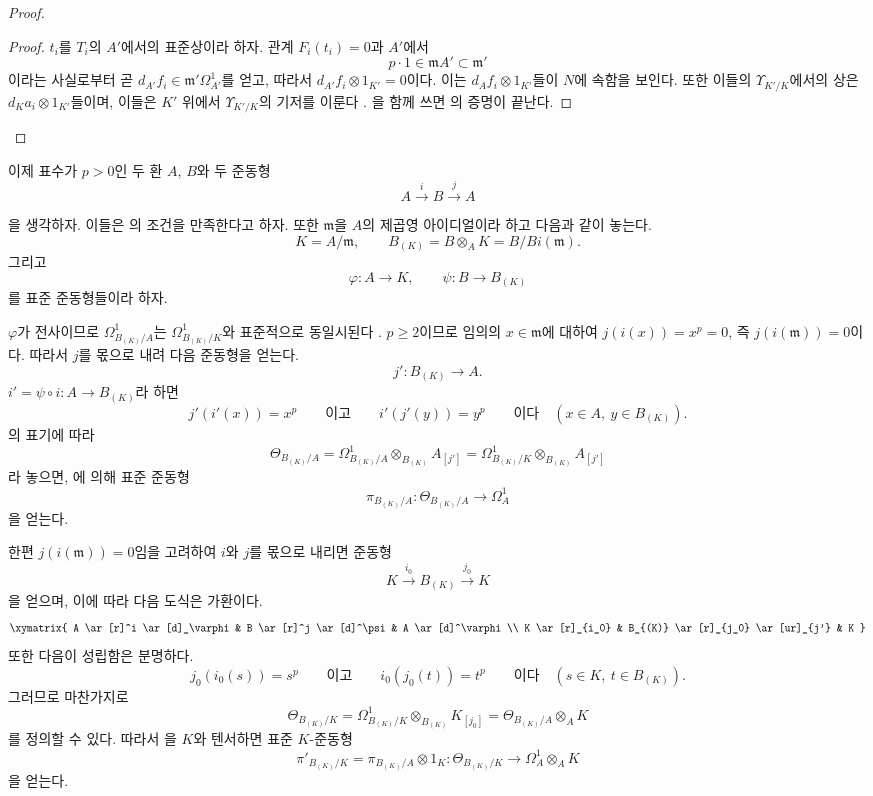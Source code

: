 \begin{proof}
\begin{proof}
$t_i$를 $T_i$의 $A'$에서의 표준상이라 하자. 관계 $F_i(t_i)=0$과
$A'$에서
\[
  p\cdot1\in\mathfrak mA'\subset\mathfrak m'
\]
이라는 사실로부터 곧
$d_{A'}f_i\in\mathfrak m'\Omega^1_{A'}$를 얻고, 따라서
$d_{A'}f_i\otimes1_{K'}=0$이다. 이는
$d_Af_i\otimes1_{K'}$들이 $N$에 속함을 보인다. 또한 이들의
$\Upsilon_{K'/K}$에서의 상은 $d_Ka_i\otimes1_{K'}$들이며, 이들은
$K'$ 위에서 $\Upsilon_{K'/K}$의 기저를 이룬다
. 을 함께 쓰면
의 증명이 끝난다.
\end{proof}
\end{proof}

\begin{env}[22.4.5]
\label{0.22.4.5-ko}
이제 표수가 $p>0$인 두 환 $A$, $B$와 두 준동형
\[
  A\xrightarrow{i}B\xrightarrow{j}A
\]


을 생각하자. 이들은 의 조건을 만족한다고 하자.
또한 $\mathfrak m$을 $A$의 제곱영 아이디얼이라 하고 다음과 같이 놓는다.
\[
  K=A/\mathfrak m,\qquad
  B_{(K)}=B\otimes_AK=B/Bi(\mathfrak m).
\]
그리고
\[
  \varphi:A\longrightarrow K,\qquad
  \psi:B\longrightarrow B_{(K)}
\]
를 표준 준동형들이라 하자.

$\varphi$가 전사이므로 $\Omega^1_{B_{(K)}/A}$는
$\Omega^1_{B_{(K)}/K}$와 표준적으로 동일시된다
. $p\geqslant2$이므로 임의의
$x\in\mathfrak m$에 대하여 $j(i(x))=x^p=0$, 즉
$j(i(\mathfrak m))=0$이다. 따라서 $j$를 몫으로 내려 다음 준동형을 얻는다.
\[
  j':B_{(K)}\longrightarrow A.
\]
$i'=\psi\circ i:A\longrightarrow B_{(K)}$라 하면
\[
  j'(i'(x))=x^p\qquad\text{이고}\qquad i'(j'(y))=y^p
  \qquad\text{이다}\quad(x\in A,\ y\in B_{(K)}).
\]
의 표기에 따라
\[
  \Theta_{B_{(K)}/A}
  =\Omega^1_{B_{(K)}/A}\otimes_{B_{(K)}}A_{[j']}
  =\Omega^1_{B_{(K)}/K}\otimes_{B_{(K)}}A_{[j']}
\]
라 놓으면, 에 의해 표준 준동형
\begin{equation}
\label{0.22.4.5.1-ko}
  \pi_{B_{(K)}/A}:\Theta_{B_{(K)}/A}\longrightarrow\Omega^1_A
  \tag{22.4.5.1}
\end{equation}
을 얻는다.

한편 $j(i(\mathfrak m))=0$임을 고려하여 $i$와 $j$를 몫으로 내리면
준동형
\[
  K\xrightarrow{i_0}B_{(K)}\xrightarrow{j_0}K
\]
을 얻으며, 이에 따라 다음 도식은 가환이다.
\[
  \xymatrix{
    A \ar[r]^i \ar[d]_\varphi & B \ar[r]^j \ar[d]^\psi & A \ar[d]^\varphi \\
    K \ar[r]_{i_0} & B_{(K)} \ar[r]_{j_0} \ar[ur]_{j'} & K
  }
\]
또한 다음이 성립함은 분명하다.
\[
  j_0(i_0(s))=s^p\qquad\text{이고}\qquad i_0(j_0(t))=t^p
  \qquad\text{이다}\quad(s\in K,\ t\in B_{(K)}).
\]
그러므로 마찬가지로
\[
  \Theta_{B_{(K)}/K}
  =\Omega^1_{B_{(K)}/K}\otimes_{B_{(K)}}K_{[j_0]}
  =\Theta_{B_{(K)}/A}\otimes_AK
\]
를 정의할 수 있다. 따라서 을 $K$와 텐서하면
표준 $K$-준동형
\begin{equation}
\label{0.22.4.5.2-ko}
  \pi'_{B_{(K)}/K}=\pi_{B_{(K)}/A}\otimes1_K:
  \Theta_{B_{(K)}/K}\longrightarrow\Omega^1_A\otimes_AK
  \tag{22.4.5.2}
\end{equation}
을 얻는다.


\end{env}
